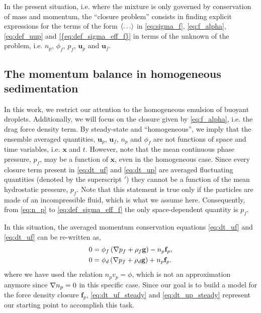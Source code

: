 In the present situation, i.e. where the mixture is only governed by conservation of mass and momentum,  the ``closure problem'' consists in finding explicit expressions for the terms of the form $\left<\ldots\right>$ in \ref{eq:sigma_f}, \ref{eq:f_alpha}, \ref{eq:def_uup} and \ref{{eq:def_sigma_eff_f}} in terms of the unknown of the problem, i.e. $n_p$, $\phi_f$, $p_f$, $\textbf{u}_p$ and $\textbf{u}_f$. 



\subsection{ The momentum balance in homogeneous sedimentation}

In this work, we restrict our attention to the homogeneous emulsion of buoyant droplets. 
Additionally, we will focus on the closure given by \ref{eq:f_alpha}, i.e. the drag force density term. 
By steady-state and ``homogeneous'', we imply that the ensemble averaged quantities, $\textbf{u}_p$, $\textbf{u}_f$, $n_p$ and $\phi_f$ are not functions of space and time variables, i.e. $\textbf{x}$ and $t$. 
However, note that the mean continuous phase pressure, $p_f$, may be a function of $\textbf{x}$, even in the homogeneous case. 
Since every closure term present in \ref{eq:dt_uf} and \ref{eq:dt_up} are averaged fluctuating quantities (denoted by the superscript $'$) they cannot be a function of the mean hydrostatic pressure, $p_f$.
Note that this statement is true only if the particles are made of an incompressible fluid, which is what we assume here. 
Consequently, from \ref{eq:n_p} to \ref{eq:def_sigma_eff_f} the only space-dependent quantity is $p_f$. 

In this situation, the averaged momentum conservation equations \ref{eq:dt_uf} and \ref{eq:dt_uf} can be re-written as, 
\begin{align}
    0 
    &= \phi_f 
    \left(\grad p_f
    + \rho_f \textbf{g}\right)
    - n_p \textbf{f}_p, 
    \label{eq:dt_uf_steady}
    \\
    0
    &= 
    \phi_d \left(\grad p_f
    + \rho_d \textbf{g}\right)
    + n_p \textbf{f}_p. 
    \label{eq:dt_up_steady}
\end{align}
where we have used the relation $n_p v_p = \phi$, which is not an approximation anymore since $\mathbf{\nabla} n_p = 0$ in this specific case.
Since our goal is to build a model for the force density closure $\textbf{f}_p$, \ref{eq:dt_uf_steady} and \ref{eq:dt_up_steady} represent our starting point to accomplish this task. 



